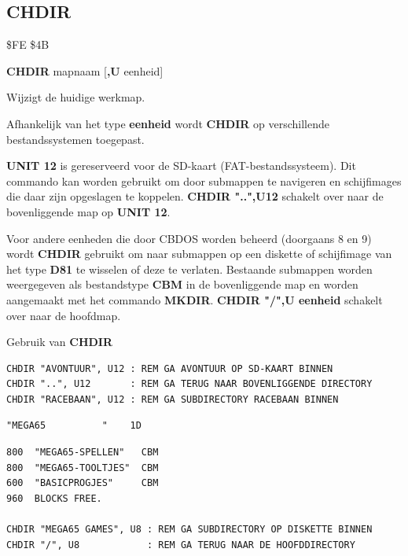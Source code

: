 \subsection{CHDIR}
\begin{description}[leftmargin=2cm,style=nextline]
\item [Token:]    \$FE \$4B

\item [Formaat:]   {\bf CHDIR} mapnaam [{\bf,U} eenheid]

\item [Gebruik:]    Wijzigt de huidige werkmap.

                  \dirnamedefinition

                  Afhankelijk van het type {\bf eenheid} wordt {\bf CHDIR} op verschillende bestandssystemen toegepast.

{\bf UNIT 12} is gereserveerd voor de SD-kaart (FAT-bestandssysteem). Dit commando kan worden gebruikt om door submappen te navigeren en schijfimages die daar zijn opgeslagen te koppelen. {\bf CHDIR "..",U12} schakelt over naar de bovenliggende map op {\bf UNIT 12}.

Voor andere eenheden die door CBDOS worden beheerd (doorgaans 8 en 9) wordt {\bf CHDIR} gebruikt om naar submappen op een diskette of schijfimage van het type {\bf D81} te wisselen of deze te verlaten. Bestaande submappen worden weergegeven als bestandstype {\bf CBM} in de bovenliggende map en worden aangemaakt met het commando {\bf MKDIR}. {\bf CHDIR "/",U eenheid} schakelt over naar de hoofdmap.

\item [Voorbeelden:] Gebruik van {\bf CHDIR}

\begin{tcolorbox}[colback=black,coltext=white]
\verbatimfont{\codefont}
\begin{verbatim}
CHDIR "AVONTUUR", U12 : REM GA AVONTUUR OP SD-KAART BINNEN
CHDIR "..", U12       : REM GA TERUG NAAR BOVENLIGGENDE DIRECTORY
CHDIR "RACEBAAN", U12 : REM GA SUBDIRECTORY RACEBAAN BINNEN
\end{verbatim}

\selectfont{\codefont 0}
\begin{tcolorbox}[colback=white,coltext=black,arc=0mm,boxrule=0mm,
       left*=0.5mm,right*=0mm,top=0mm,bottom=0mm,nobeforeafter,       left skip=0.5mm,       width=28mm,height=3mm,valign=center]
\begin{verbatim}
"MEGA65          "    1D
\end{verbatim}
\end{tcolorbox}
\begin{verbatim}
800  "MEGA65-SPELLEN"   CBM
800  "MEGA65-TOOLTJES"  CBM
600  "BASICPROGJES"     CBM
960  BLOCKS FREE.

CHDIR "MEGA65 GAMES", U8 : REM GA SUBDIRECTORY OP DISKETTE BINNEN
CHDIR "/", U8            : REM GA TERUG NAAR DE HOOFDDIRECTORY
\end{verbatim}
\end{tcolorbox}
\end{description}

